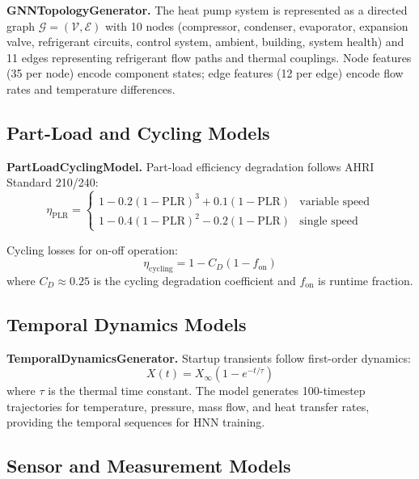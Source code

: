 \documentclass[11pt]{article}
\begin{document}
\textbf{GNNTopologyGenerator.} The heat pump system is represented as a directed graph $\mathcal{G} = (\mathcal{V}, \mathcal{E})$ with 10 nodes (compressor, condenser, evaporator, expansion valve, refrigerant circuits, control system, ambient, building, system health) and 11 edges representing refrigerant flow paths and thermal couplings. Node features (35 per node) encode component states; edge features (12 per edge) encode flow rates and temperature differences.

\subsection{Part-Load and Cycling Models}

\textbf{PartLoadCyclingModel.} Part-load efficiency degradation follows AHRI Standard 210/240:
\begin{equation}
\eta_{\text{PLR}} = \begin{cases} 1 - 0.2(1 - \text{PLR})^3 + 0.1(1 - \text{PLR}) & \text{variable speed} \\ 1 - 0.4(1 - \text{PLR})^2 - 0.2(1 - \text{PLR}) & \text{single speed} \end{cases}
\end{equation}

Cycling losses for on-off operation:
\begin{equation}
\eta_{\text{cycling}} = 1 - C_D(1 - f_{\text{on}})
\end{equation}
where $C_D \approx 0.25$ is the cycling degradation coefficient and $f_{\text{on}}$ is runtime fraction.

\subsection{Temporal Dynamics Models}

\textbf{TemporalDynamicsGenerator.} Startup transients follow first-order dynamics:
\begin{equation}
X(t) = X_{\infty}(1 - e^{-t/\tau})
\end{equation}
where $\tau$ is the thermal time constant. The model generates 100-timestep trajectories for temperature, pressure, mass flow, and heat transfer rates, providing the temporal sequences for HNN training.

\subsection{Sensor and Measurement Models}
\end{document}

